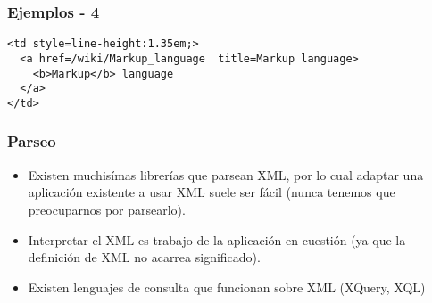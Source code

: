 \begin{frame}
\frametitle{Ejemplos - 4}
\footnotesize
\texttt{<td style=\dquote line-height:1.35em;\dquote>		\\
	~~<a href=\dquote /wiki/Markup\_language\dquote ~
		title=\dquote Markup language\dquote>		\\
	~~~~<b>Markup</b> language					\\
	~~</a>							\\
	</td>
}
\end{frame}

\begin{frame}
\frametitle{Parseo}
\begin{itemize}
	\item	Existen muchisímas librerías que parsean XML, por lo cual
		adaptar una aplicación existente a usar XML suele ser fácil
		(nunca tenemos que preocuparnos por parsearlo).
		\pause

	\item	Interpretar el XML es trabajo de la aplicación en cuestión
		(ya que la definición de XML no acarrea significado).
		\pause

	\item	Existen lenguajes de consulta que funcionan sobre XML
		(XQuery, XQL)
\end{itemize}
\end{frame}
